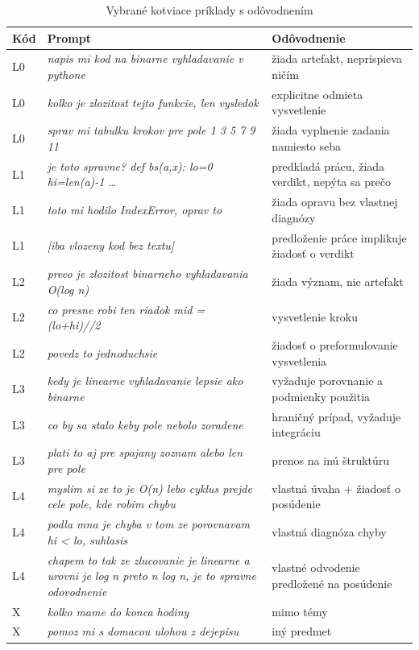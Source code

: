 \begin{table}[H]
\centering
\caption{Vybrané kotviace príklady s odôvodnením}
\label{tab:kotvy-priklady}
\scriptsize
\begin{tabularx}{\textwidth}{@{}l X X@{}}
\toprule
\textbf{Kód} & \textbf{Prompt} & \textbf{Odôvodnenie} \\
\midrule
L0 & \emph{napis mi kod na binarne vyhladavanie v pythone} & žiada artefakt, neprispieva ničím \\
L0 & \emph{kolko je zlozitost tejto funkcie, len vysledok} & explicitne odmieta vysvetlenie \\
L0 & \emph{sprav mi tabulku krokov pre pole 1 3 5 7 9 11} & žiada vyplnenie zadania namiesto seba \\
\midrule
L1 & \emph{je toto spravne? def bs(a,x): lo=0 hi=len(a)-1 \ldots} & predkladá prácu, žiada verdikt, nepýta sa prečo \\
L1 & \emph{toto mi hodilo IndexError, oprav to} & žiada opravu bez vlastnej diagnózy \\
L1 & \emph{[iba vlozeny kod bez textu]} & predloženie práce implikuje žiadosť o verdikt \\
\midrule
L2 & \emph{preco je zlozitost binarneho vyhladavania O(log n)} & žiada význam, nie artefakt \\
L2 & \emph{co presne robi ten riadok mid = (lo+hi)//2} & vysvetlenie kroku \\
L2 & \emph{povedz to jednoduchsie} & žiadosť o preformulovanie vysvetlenia \\
\midrule
L3 & \emph{kedy je linearne vyhladavanie lepsie ako binarne} & vyžaduje porovnanie a podmienky použitia \\
L3 & \emph{co by sa stalo keby pole nebolo zoradene} & hraničný prípad, vyžaduje integráciu \\
L3 & \emph{plati to aj pre spajany zoznam alebo len pre pole} & prenos na inú štruktúru \\
\midrule
L4 & \emph{myslim si ze to je O(n) lebo cyklus prejde cele pole, kde robim chybu} & vlastná úvaha + žiadosť o posúdenie \\
L4 & \emph{podla mna je chyba v tom ze porovnavam hi < lo, suhlasis} & vlastná diagnóza chyby \\
L4 & \emph{chapem to tak ze zlucovanie je linearne a urovni je log n preto n log n, je to spravne odovodnenie} & vlastné odvodenie predložené na posúdenie \\
\midrule
X & \emph{kolko mame do konca hodiny} & mimo témy \\
X & \emph{pomoz mi s domacou ulohou z dejepisu} & iný predmet \\
\bottomrule
\end{tabularx}
\end{table}

